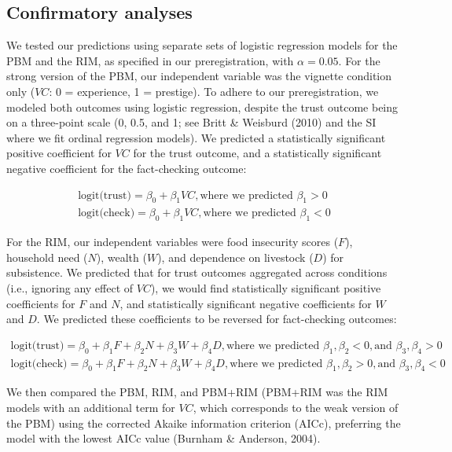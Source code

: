 \documentclass[
  11pt,
]{article}
\begin{document}
\hypertarget{confirmatory-analyses}{%
\subsection{Confirmatory analyses}\label{confirmatory-analyses}}

We tested our predictions using separate sets of logistic regression
models for the PBM and the RIM, as specified in our preregistration,
with \(\alpha=0.05\). For the strong version of the PBM, our independent
variable was the vignette condition only (\(VC\): 0 = experience, 1 =
prestige). To adhere to our preregistration, we modeled both outcomes
using logistic regression, despite the trust outcome being on a
three-point scale (0, 0.5, and 1; see Britt \& Weisburd (2010) and the
SI where we fit ordinal regression models). We predicted a statistically
significant positive coefficient for \(VC\) for the trust outcome, and a
statistically significant negative coefficient for the fact-checking
outcome:

\[
\begin{aligned}
\text{logit(trust)} = \beta_0 + \beta_{1}VC, \text{where we predicted } \beta_1 > 0 \\
\text{logit(check)} = \beta_0 + \beta_{1}VC, \text{where we predicted } \beta_1 < 0
\end{aligned}
\]

For the RIM, our independent variables were food insecurity scores
(\(F\)), household need (\(N\)), wealth (\(W\)), and dependence on
livestock (\(D\)) for subsistence. We predicted that for trust outcomes
aggregated across conditions (i.e., ignoring any effect of \(VC\)), we
would find statistically significant positive coefficients for \(F\) and
\(N\), and statistically significant negative coefficients for \(W\) and
\(D\). We predicted these coefficients to be reversed for fact-checking
outcomes:

\[
\begin{aligned}
\text{logit(trust)} = \beta_0 + \beta_{1}F + \beta_{2}N +\beta_{3}W +\beta_{4}D, \text{where we predicted } \beta_1, \beta_2 < 0, \text{and } \beta_3, \beta_4 > 0 \\
\text{logit(check)} = \beta_0 + \beta_{1}F + \beta_{2}N +\beta_{3}W +\beta_{4}D, \text{where we predicted } \beta_1, \beta_2 > 0, \text{and } \beta_3, \beta_4 <  0
\end{aligned}
\]

We then compared the PBM, RIM, and PBM+RIM (PBM+RIM was the RIM models
with an additional term for \(VC\), which corresponds to the weak
version of the PBM) using the corrected Akaike information criterion
(AICc), preferring the model with the lowest AICc value (Burnham \&
Anderson, 2004).
\end{document}
